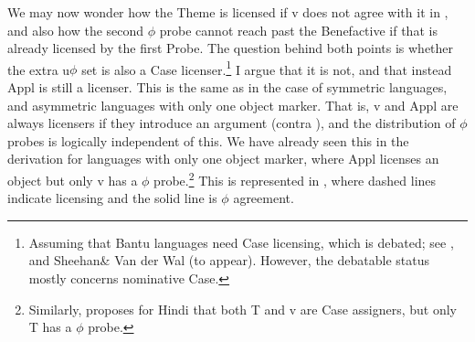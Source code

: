 \documentclass[output=paper
,modfonts
,nonflat]{langsci/langscibook}
\begin{document}
We may now wonder how the Theme is licensed if v does not agree with it in , and also how the second $\phi$ probe cannot reach past the Benefactive if that is already licensed by the first Probe. The question behind both points is whether the extra u$\phi$ set is also a Case licenser.\footnote{Assuming that Bantu languages need Case licensing, which is debated; see \citet{Diercks2012}, \citet{Van_der_Wal2015} and Sheehan\& Van der Wal (to appear). However, the debatable status mostly concerns nominative Case.} I argue that it is not, and that instead Appl is still a licenser. This is the same as in the case of symmetric languages, and asymmetric languages with only one object marker. That is, v and Appl are always licensers if they introduce an argument (contra \citealt{Woolford1995}), and the distribution of $\phi$ probes is logically independent of this. We have already seen this in the derivation for languages with only one object marker, where Appl licenses an object but only v has a $\phi$ probe.\footnote{Similarly, \citet{Bhatt2005} proposes for Hindi that both T and v are Case assigners, but only T has a $\phi$ probe.} This is represented in , where dashed lines indicate licensing and the solid line is $\phi$ agreement.
\end{document}
